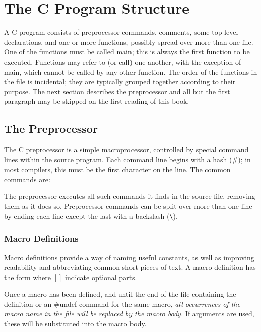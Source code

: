 \pagestyle{biiheadings}
\renewcommand{\lefthead}{Wheeler and Smit}



\chapter{The C Program Structure}


A C  program consists  of {\kc preprocessor commands}, {\kc
comments}, some {\kc top-level declarations}, and  one or  more {\kc
functions},  possibly spread over more than one file. One  of the 
functions must  be called  {\cd main}; this  is always  the first
function to  be executed.  Functions may refer to (or call) one
another, with the exception of  {\cd main}, which cannot be called by
any other function. The order of the functions  in the  file is
incidental; they are typically grouped together according to their
purpose.  The next section describes the preprocessor and all but the
first paragraph may be skipped on the first reading of this book.

\section{The Preprocessor}

The C preprocessor is  a simple  macroprocessor, controlled  by
special  command  lines within the source program.  Each command line
begins with a hash ({\cd \#}); in most compilers, this must be the
first character on the line. The common commands are:
 
The preprocessor  executes all  such  commands  it  finds  in the 
source file, removing them as it does so. Preprocessor commands can
be split over more than one line by ending each line except the last
with a backslash (\verb+\+).

\subsection{Macro Definitions}

Macro definitions  provide a  way of  naming useful constants, as well
as improving readability  and abbreviating  common short  pieces of
text. A macro definition has the form
where $[]$ indicate optional parts.

Once a macro has been defined, and until the end of the file containing
the definition or  an {\cd \#undef}  command for  the same  macro,
{\em all occurrences of the macro name  in the  file will  be replaced by
the macro body.}  If arguments are used, these will be substituted into
the macro body.

